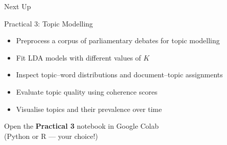 \documentclass[aspectratio=169]{beamer}
\begin{document}
\begin{frame}{Next Up}
    \begin{center}
        {\Large \alert{Practical 3: Topic Modelling}}\\[0.5cm]
        \begin{itemize}
            \item Preprocess a corpus of parliamentary debates for topic modelling
            \item Fit LDA models with different values of \(K\)
            \item Inspect topic--word distributions and document--topic assignments
            \item Evaluate topic quality using coherence scores
            \item Visualise topics and their prevalence over time
        \end{itemize}
        \vspace{0.5cm}
        {\normalsize Open the \textbf{Practical 3} notebook in Google Colab\\(Python or R --- your choice!)}
    \end{center}
\end{frame}
\end{document}
